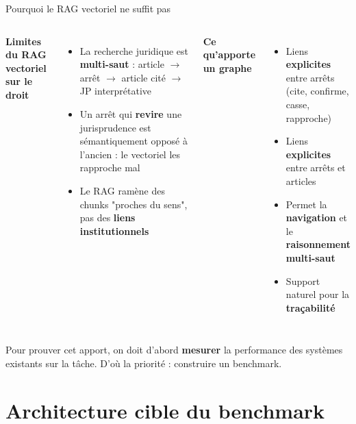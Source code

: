 \documentclass[aspectratio=169,10pt]{beamer}
\newcommand{\keybox}[1]{%
  \begin{center}
  \colorbox{accentsoft}{\parbox{0.92\linewidth}{\centering #1}}
  \end{center}}
\begin{document}
\begin{frame}{Pourquoi le RAG vectoriel ne suffit pas}
  \begin{columns}[T]
    \textbf{Limites du RAG vectoriel sur le droit}
    \begin{itemize}\footnotesize
      \item La recherche juridique est \textbf{multi-saut} : article $\to$ arrêt $\to$ article cité $\to$ JP interprétative
      \item Un arrêt qui \textbf{revire} une jurisprudence est sémantiquement opposé à l'ancien : le vectoriel les rapproche mal
      \item Le RAG ramène des chunks "proches du sens", pas des \textbf{liens institutionnels}
    \end{itemize}

    \textbf{Ce qu'apporte un graphe}
    \begin{itemize}\footnotesize
      \item Liens \textbf{explicites} entre arrêts (cite, confirme, casse, rapproche)
      \item Liens \textbf{explicites} entre arrêts et articles
      \item Permet la \textbf{navigation} et le \textbf{raisonnement multi-saut}
      \item Support naturel pour la \textbf{traçabilité}
    \end{itemize}
  \end{columns}

  \vspace{0.5em}
  \keybox{\small Pour prouver cet apport, on doit d'abord \textbf{mesurer} la performance des systèmes existants sur la tâche. D'où la priorité : construire un benchmark.}
\end{frame}

\section{Architecture cible du benchmark}
\end{document}
